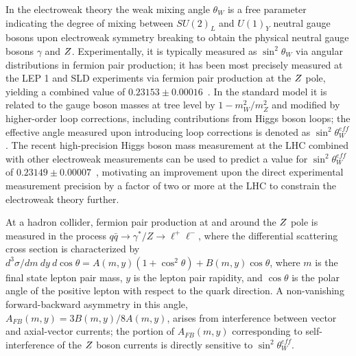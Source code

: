 
In the electroweak theory the weak mixing angle $\theta_W$ is a free
parameter indicating the degree of mixing between $SU(2)_L$ and
$U(1)_Y$ neutral gauge bosons upon electroweak symmetry breaking to
obtain the physical neutral gauge bosons $\gamma$ and $Z$.
Experimentally, it is typically measured as $\sin^2\theta_W$ via
angular distributions in fermion pair production; it has been most
precisely measured at the LEP 1 and SLD experiments via fermion pair
production at the $Z$ pole, yielding a combined value of
$0.23153\pm0.00016$~\cite{ALEPH:2005ab}. In the standard model it is
related to the gauge boson masses at tree level by $1-m_W^2/m_Z^2$ and
modified by higher-order loop corrections, including contributions
from Higgs boson loops; the effective angle measured upon introducing
loop corrections is denoted as $\sin^2\theta^{eff}_{W}$. The recent
high-precision Higgs boson mass measurement at the LHC combined with
other electroweak measurements can be used to predict a value for
$\sin^2\theta^{eff}_{W}$ of $0.23149 \pm 0.00007$~\cite{Baak:2014ora},
motivating an improvement upon the direct experimental measurement
precision by a factor of two or more at the LHC to constrain the
electroweak theory further.

At a hadron collider, fermion pair production at and around the $Z$
pole is measured in the process
$q\bar{q}\rightarrow \gamma^*/Z \rightarrow \ell^+\ell^-$, where the
differential scattering cross section is characterized by
$d^3\sigma/dm \ dy \ d\cos\theta = A(m,y)(1+\cos^2\theta) +
B(m,y)\cos\theta$, where $m$ is the final state lepton pair mass, $y$
is the lepton pair rapidity, and $\cos\theta$ is the polar angle of
the positive lepton with respect to the quark direction. A
non-vanishing forward-backward asymmetry in this angle, $A_{FB}(m,y) =
3B(m,y)/8A(m,y)$, arises from interference between vector and
axial-vector currents; the portion of $A_{FB}(m,y)$ corresponding to
self-interference of the $Z$ boson currents is directly sensitive to
$\sin^2\theta^{eff}_{W}$.

